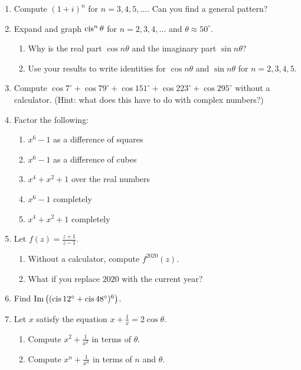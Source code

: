 \documentclass[../gatm.tex]{subfiles}
\begin{document}
\begin{enumerate}
\item Compute $(1+i)^n$ for $n=3,4,5,\ldots$. Can you find a general pattern? %
\item Expand and graph $\operatorname{cis}^n \theta$ for $n=2,3,4,\ldots$ and $\theta\approx 50^\circ$. %

\begin{enumerate}
\item Why is the real part $\cos n\theta$ and the imaginary part $\sin n\theta$? %
\item Use your results to write identities for $\cos n\theta$ and $\sin n\theta$ for $n=2,3,4,5$. %
\end{enumerate}

\newcommand{\cosdeg}[1] {\cos #1^\circ}

\item Compute $\cosdeg{7} + \cosdeg{79} + \cosdeg{151} + \cosdeg{223} + \cosdeg{295}$ without a calculator. (Hint: what does this have to do with complex numbers?) %
\item Factor the following: %
\begin{multicols}{2}
\begin{enumerate}
\item $x^6-1$ as a difference of squares %
\item $x^6-1$ as a difference of cubes %
\item $x^4+x^2+1$ over the real numbers %
\item $x^6-1$ completely %
\item $x^4+x^2+1$ completely %
\end{enumerate}
\end{multicols}

\item Let $f(z)=\frac{z+1}{z-1}$. %
\begin{enumerate}
\item Without a calculator, compute $f^{2020}(z)$. %
\item What if you replace $2020$ with the current year? %
\end{enumerate}

\item Find $\operatorname{Im}\left((\operatorname{cis} 12^\circ + \operatorname{cis} 48^\circ)^6\right)$. %

\item Let $x$ satisfy the equation $x+\frac{1}{x}=2\cos\theta$. %
\begin{enumerate}
\item Compute $x^2+\frac{1}{x^2}$ in terms of $\theta$. %
\item Compute $x^n+\frac{1}{x^n}$ in terms of $n$ and $\theta$. %
\end{enumerate}
\end{enumerate}
\end{document}
